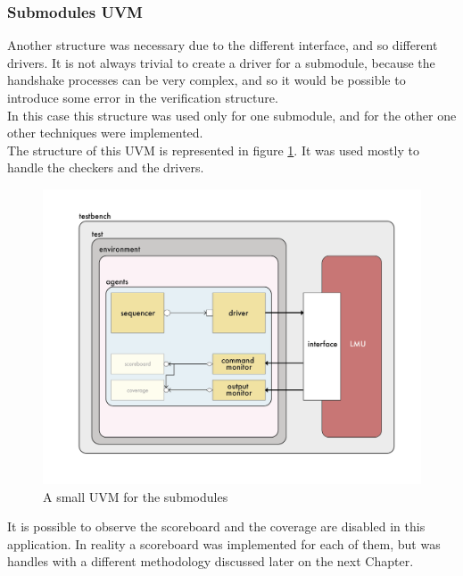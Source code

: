 \subsubsection{Submodules UVM}

Another structure was necessary due to the different interface, and so different drivers. It is not always trivial to create a driver for a submodule, because the handshake processes can be very complex, and so it would be possible to introduce some error in the verification structure.\\

In this case this structure was used only for one submodule, and for the other one other techniques were implemented.\\

The structure of this UVM is represented in figure \ref{sub-uvm}. It was used mostly to handle the checkers and the drivers.

\begin{figure}[H]
    \centering
    \includegraphics[scale = 0.5]{Chapter_1/img/sub-uvm.png}
    \caption{A small UVM for the submodules}
    \label{sub-uvm}
\end{figure}

It is possible to observe the scoreboard and the coverage are disabled in this application. In reality a scoreboard was implemented for each of them, but was handles with a different methodology discussed later on the next Chapter.